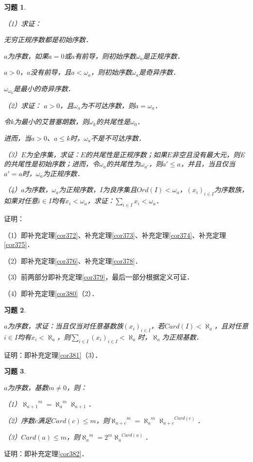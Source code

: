 \documentclass[12pt, a4paper, oneside]{book}
\newtheorem{exer}{习题}
\begin{document}
			\begin{exer}\label{exer171}
				\hfill\par
				（1）求证：
				\par
				无穷正规序数都是初始序数．
				\par
				$a$为序数，如果$a=0$或$a$有前导，则初始序数$\omega_a$是正规序数．
				\par
				$a>0$，$a$没有前导，且$a<\omega_a$，则初始序数$\omega_a$是奇异序数．
				\par		
				$\omega_{\omega_0}$是最小的奇异序数．
				\par
				（2）求证：
				$a>0$，且$\omega_a$为不可达序数，则$a=\omega_a$．
				\par
				令$k$为最小的艾普塞朗数，则$\omega_k$的共尾性是$\omega_0$．
				\par
				进而，当$a>0$、$a\leq k$时，$\omega_a$不是不可达序数．
				\par
				（3）$E$为全序集，求证：$E$的共尾性是正规序数；如果$E$非空且没有最大元，则E的共尾性是初始序数；进而，令$\omega_a$的共尾性为$\omega_{a'}$，则$a'\leq a$，并且，当且仅当$a'=a$时，$\omega_a$为正规序数．
				\par
				（4）$a$为序数，$\omega_a$为正规序数，$I$为良序集且$Ord(I)<\omega_a$，$(x_i)_{i\in I}$为序数族，如果对任意$i\in I$均有$x_i<\omega_a$，求证：$\sum\limits_{i\in I}x_i<\omega_a$．
			\end{exer}
			证明：
			\par
			（1）即补充定理\ref{cor372}、补充定理\ref{cor373}、补充定理\ref{cor374}、补充定理\ref{cor375}．
			\par
			（2）即补充定理\ref{cor376}、补充定理\ref{cor378}．
			\par
			（3）前两部分即补充定理\ref{cor379}，最后一部分根据定义可证．
			\par
			（4）即补充定理\ref{cor380}（2）．
			
			\begin{exer}\label{exer172}
				\hfill\par
				$a$为序数，求证：当且仅当对任意基数族$(x_i)_{i\in I}$，若$Card(I)<\aleph_a$，且对任意$i\in I$均有$x_i<\aleph_a$，则$\sum\limits_{i\in I}(x_i)_{i\in I}<\aleph_a$时，$\aleph_a$为正规基数．
			\end{exer}
			证明：即补充定理\ref{cor381}（3）．
			
			\begin{exer}\label{exer173}
				\hfill\par
				$a$为序数，基数$m\neq 0$，则：
				\par
				（1）${\aleph_{a+1}}^m={\aleph_a}^m\aleph_{a+1}$．
				\par
				（2）序数$c$满足$Card(c)\leq m$，则${\aleph_{a+c}}^m={\aleph_a}^m{\aleph_{a+c}}^{Card(c)}$．
				\par
				（3）$Card(a)\leq m$，则${\aleph_a}^m=2^m{\aleph_a}^{Card(a)}$．
			\end{exer}
			证明：即补充定理\ref{cor382}．
			
\end{document}
